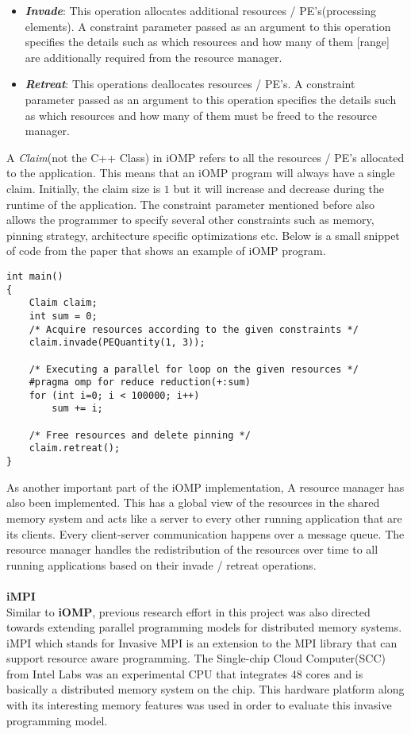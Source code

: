 \begin{itemize}
\item \textbf{\textit{Invade}}: This operation allocates additional resources / PE's(processing elements). A constraint parameter passed as an argument to this operation specifies the details such as which resources and how many of them [range] are additionally required from the resource manager.
\item \textbf{\textit{Retreat}}: This operations deallocates resources / PE's. A constraint parameter passed as an argument to this operation specifies the details such as which resources and how many of them must be freed to the resource manager.
\end{itemize}
A \textit{Claim}(not the C++ Class) in iOMP refers to all the resources / PE's allocated to the application. This means that an iOMP program will always have a single claim. Initially, the claim size is $1$ but it will increase and decrease during the runtime of the application. The constraint parameter mentioned before also allows the programmer to specify several other constraints such as memory, pinning strategy, architecture specific optimizations etc. Below is a small snippet of code from the paper that shows an example of iOMP program.
\begin{lstlisting}[frame=single]
int main() 
{
	Claim claim;
	int sum = 0;
	/* Acquire resources according to the given constraints */
	claim.invade(PEQuantity(1, 3));
	
	/* Executing a parallel for loop on the given resources */
	#pragma omp for reduce reduction(+:sum)
	for (int i=0; i < 100000; i++)
		sum += i;
	
	/* Free resources and delete pinning */
	claim.retreat();
}		
\end{lstlisting}
As another important part of the iOMP implementation,  A resource manager has also been implemented. This has a global view of the resources in the shared memory system and acts like a server to every other running application that are its clients. Every client-server communication happens over a message queue. The resource manager handles the redistribution of the resources over time to all running applications based on their invade / retreat operations.\\ \\
\textbf{iMPI}\\
Similar to \textbf{iOMP}, previous research effort in this project was also directed towards extending parallel programming models for distributed memory systems. iMPI which stands for Invasive MPI is an extension to the MPI library that can support resource aware programming. The Single-chip Cloud Computer(SCC) from Intel Labs was an experimental CPU that integrates 48 cores and is basically a distributed memory system on the chip. This hardware platform along with its interesting memory features was used in order to evaluate this invasive programming model.\\ \\
